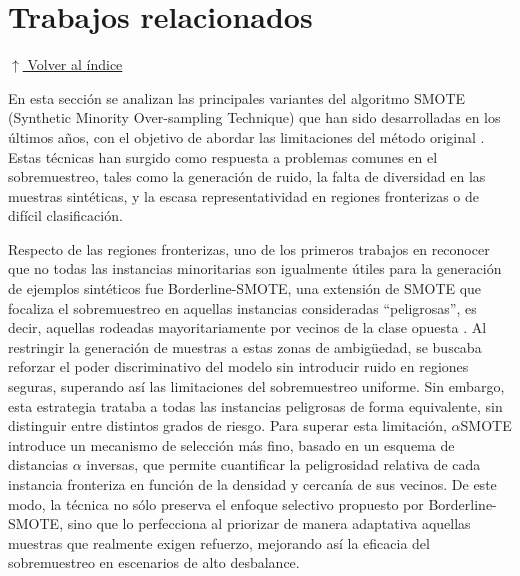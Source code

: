 \documentclass[12pt,a4paper]{article}
\begin{document}
\section{Trabajos relacionados} \noindent\hyperlink{toc}{\small$\uparrow$ Volver al índice}

En esta sección se analizan las principales variantes del algoritmo SMOTE (Synthetic Minority Over-sampling Technique) que han sido desarrolladas en los últimos años, con el objetivo de abordar las limitaciones del método original \parencite{chawla2002smote}. Estas técnicas han surgido como respuesta a problemas comunes en el sobremuestreo, tales como la generación de ruido, la falta de diversidad en las muestras sintéticas, y la escasa representatividad en regiones fronterizas o de difícil clasificación.

Respecto de las regiones fronterizas, uno de los primeros trabajos en reconocer que no todas las instancias minoritarias son igualmente útiles para la generación de ejemplos sintéticos fue Borderline-SMOTE, una extensión de SMOTE que focaliza el sobremuestreo en aquellas instancias consideradas “peligrosas”, es decir, aquellas rodeadas mayoritariamente por vecinos de la clase opuesta \parencite{han2005borderline}. Al restringir la generación de muestras a estas zonas de ambigüedad, se buscaba reforzar el poder discriminativo del modelo sin introducir ruido en regiones seguras, superando así las limitaciones del sobremuestreo uniforme. Sin embargo, esta estrategia trataba a todas las instancias peligrosas de forma equivalente, sin distinguir entre distintos grados de riesgo. Para superar esta limitación, $ \alpha $SMOTE \parencite{feng2021novel} introduce un mecanismo de selección más fino, basado en un esquema de distancias $ \alpha $ inversas, que permite cuantificar la peligrosidad relativa de cada instancia fronteriza en función de la densidad y cercanía de sus vecinos. De este modo, la técnica no sólo preserva el enfoque selectivo propuesto por Borderline-SMOTE, sino que lo perfecciona al priorizar de manera adaptativa aquellas muestras que realmente exigen refuerzo, mejorando así la eficacia del sobremuestreo en escenarios de alto desbalance.
\end{document}

